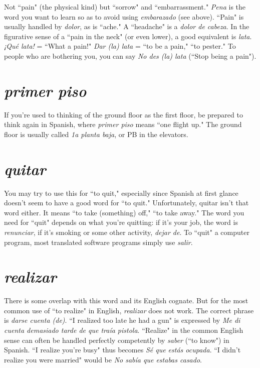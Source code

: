 Not ``pain" (the physical kind) but ``sorrow" and ``embarrassment." \emph{Pena} is the word you want to learn so as to avoid using
\emph{embarazado} (see above). ``Pain" is usually handled by \emph{dolor}, as is
``ache." A ``headache" is a \emph{dolor de cabeza}. In the figurative sense of
a ``pain in the neck" (or even lower), a good equivalent is \emph{lata}. \emph{¡Qué
	lata!} = ``What a pain!" \emph{Dar (la) lata} = ``to be a pain," ``to pester." To
people who are bothering you, you can say \emph{No des (la) lata} (``Stop being a pain").

\section{\emph{primer piso}}

If you're used to thinking of the ground floor as
the first floor, be prepared to think again in Spanish, where \emph{primer piso}
means ``one flight up." The ground floor is usually called \emph{1a planta
	baja}, or PB in the elevators.

\section{\emph{quitar}}

You may try to use this for ``to quit," especially
since Spanish at first glance doesn't seem to have a good word for ``to
quit." Unfortunately, quitar isn't that word either. It means ``to take
(something) off," ``to take away." The word you need for ``quit" depends on what you're quitting: if it's your job, the word is \emph{renunciar}, if
it's smoking or some other activity, \emph{dejar de}. To ``quit" a computer
program, most translated software programs simply use \emph{salir}.

\section{\emph{realizar}}

There is some overlap with this word and its English cognate. But for the most common use of ``to realize" in English,
\emph{realizar} does not work. The correct phrase is \emph{darse cuenta (de)}. ``I realized too late he had a gun" is expressed by \emph{Me di cuenta demasiado
	tarde de que traía pistola}. ``Realize" in the common English sense can
often be handled perfectly competently by \emph{saber} (``to know") in Spanish. ``I realize you're busy" thus becomes \emph{Sé que estás ocupada}. ``I
didn't realize you were married" would be \emph{No sabía que estabas
	casado}.

